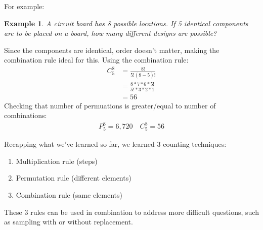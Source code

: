 \documentclass[../IND E 315.tex]{subfiles}
\newtheorem{exmp}{Example}
\begin{document}
For example:
\begin{exmp}
    A circuit board has 8 possible locations. If 5 \emph{identical} components are to be placed on a board, how many different designs are possible?
\end{exmp}
Since the components are identical, order doesn't matter, making the combination rule ideal for this. Using the combination rule:
\begin{equation*}
    \begin{aligned}
        C^8_5 &= \frac{8!}{5!(8-5)!} \\
                &= \frac{8*7*6*5!}{5!*3*2*1} \\
                &= 56
    \end{aligned}
\end{equation*}
Checking that number of permuations is greater/equal to number of combinations:
\begin{equation*}
    \begin{aligned}
        P^8_5 = 6,720 \quad C^8_5 = 56
    \end{aligned}
\end{equation*}

Recapping what we've learned so far, we learned 3 counting techniques:
\begin{enumerate}
    \item Multiplication rule (steps)
    \item Permutation rule (different elements)
    \item Combination rule (same elements)
\end{enumerate}
These 3 rules can be used in combination to address more difficult questions, such as sampling with or without replacement.
\end{document}
